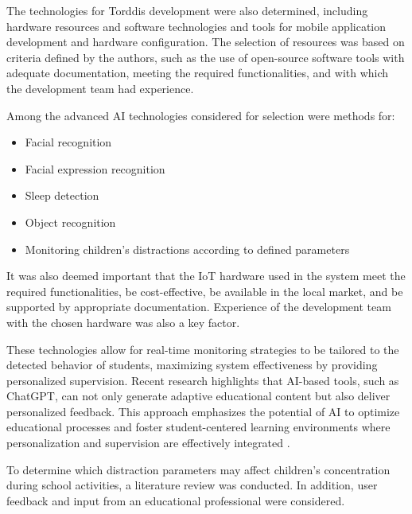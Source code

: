 				
                The technologies for Torddis development were also determined, including hardware resources and software technologies and tools for mobile application development and hardware configuration. The selection of resources was based on criteria defined by the authors, such as the use of open-source software tools with adequate documentation, meeting the required functionalities, and with which the development team had experience.
                
                Among the advanced AI technologies considered for selection were methods for:
                
                \begin{itemize}
                    \item Facial recognition
                    
                    \item Facial expression recognition
                    
                    \item Sleep detection
                    
                    \item Object recognition
                    
                    \item Monitoring children’s distractions according to defined parameters
                \end{itemize}
                
                It was also deemed important that the IoT hardware used in the system meet the required functionalities, be cost-effective, be available in the local market, and be supported by appropriate documentation. Experience of the development team with the chosen hardware was also a key factor.
                
                These technologies allow for real-time monitoring strategies to be tailored to the detected behavior of students, maximizing system effectiveness by providing personalized supervision. Recent research highlights that AI-based tools, such as ChatGPT, can not only generate adaptive educational content but also deliver personalized feedback. This approach emphasizes the potential of AI to optimize educational processes and foster student-centered learning environments where personalization and supervision are effectively integrated \citep{Wang2025Development,Li2024Systematic}.
                
                To determine which distraction parameters may affect children’s concentration during school activities, a literature review was conducted. In addition, user feedback and input from an educational professional were considered.
                
